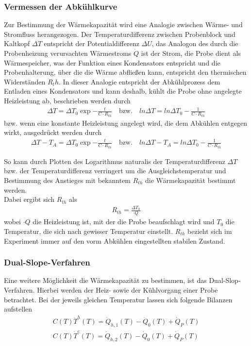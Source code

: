 \documentclass[parskip=half, a4paper,twoside,final]{article}
\begin{document}
\subsubsection{Vermessen der Abkühlkurve}\label{sec:CV_Abkühlkurve}
Zur Bestimmung der Wärmekapazität wird eine Analogie zwischen Wärme- und Stromfluss herangezogen. Der Temperaturdifferenz zwischen Probenblock und Kaltkopf $\Delta T $ entspricht der Potentialdifferenz $\Delta U$, das Analogon des durch die Probenheizung verursachten Wärmestroms $\dot{Q}$ ist der Strom, die Probe dient als Wärmespeicher, was der Funktion eines Kondensators entspricht und die Probenhalterung, über die die Wärme abfließen kann, entspricht den thermischen Widerständen $R_th$. In dieser Analogie entspricht der Abkühlprozess dem Entladen eines Kondensators und kann deshalb, kühlt die Probe ohne angelegte Heizleistung ab, beschrieben werden durch
\begin{align}
  \Delta T = \Delta T_0 \exp{-\frac{t}{C\cdot R_{th}}} \quad \text{bzw.} \quad ln\Delta T = ln \Delta T_0 - \frac{1}{C\cdot R_{th}}
\end{align}
bzw. wenn eine konstante Heizleistung angelegt wird, die dem Abkühlen entgegen wirkt, ausgedrückt werden durch
\begin{align}
  \Delta T - T_A = \Delta T_0 \exp{-\frac{t}{C\cdot R_{th}}} \quad \text{bzw.} \quad ln\Delta T -T_A= ln \Delta T_0 - \frac{1}{C\cdot R_{th}}
\end{align}

So kann durch Plotten des Logarithmus naturalis der Temperaturdifferenz $\Delta T$ bzw. der Temperaturdifferenz verringert um die Ausgleichstemperatur und Bestimmung des Anstieges mit bekanntem $R_{th}$ die Wärmekapazität bestimmt werden. \\
Dabei ergibt sich $R_{th}$ als
\begin{align}
  R_{th} = \frac{\Delta T_0}{\cdot{Q}}
\end{align}
wobei $\cdot{Q}$ die Heizleistung ist, mit der die Probe beaufschlagt wird und $T_0$ die Temperatur, die sich nach gewisser Temperatur einstellt. $R_{th}$ bezieht sich im Experiment immer auf den vorm Abkühlen eingestellten stabilen Zustand.

\subsubsection{Dual-Slope-Verfahren}\label{sec:Dual-Slope}
Eine weitere Möglichkeit die Wärmekapazität zu bestimmen, ist das Dual-Slop-Verfahren. Hierbei werden der Heiz- sowie der Kühlvorgang einer Probe betrachtet. Bei der jeweils gleichen Temperatur lassen sich folgende Bilanzen aufstellen
\begin{align}
  C(T)\dot{T}^h (T) = \dot{Q}_{h,1} (T) - \dot{Q}_0(T)+\dot{Q}_P (T)\\
  C(T)\dot{T}^c (T) = \dot{Q}_{h,2} (T) - \dot{Q}_0(T)+\dot{Q}_P (T)
\end{align}
\end{document}
